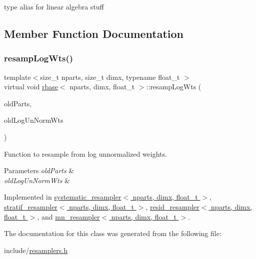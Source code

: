 type alias for linear algebra stuff 

\subsection{Member Function Documentation}
\mbox{\label{classrbase_aff0f6f88fd4656e67f5ebc870f10dd44}} 
\subsubsection{\texorpdfstring{resamp\+Log\+Wts()}{resampLogWts()}}
{\footnotesize\ttfamily template$<$size\+\_\+t nparts, size\+\_\+t dimx, typename float\+\_\+t $>$ \\
virtual void \hyperlink{classrbase}{rbase}$<$ nparts, dimx, float\+\_\+t $>$\+::resamp\+Log\+Wts (\begin{DoxyParamCaption}\item[{\hyperlink{classrbase_aa12fc826befa6ba0647b5f59ebc396ee}{array\+Vec} \&}]{old\+Parts,  }\item[{\hyperlink{classrbase_a6f76bef853e508cb5b6f546d231b06f5}{array\+Float} \&}]{old\+Log\+Un\+Norm\+Wts }\end{DoxyParamCaption})\hspace{0.3cm}{\ttfamily [pure virtual]}}



Function to resample from log unnormalized weights. 


\begin{DoxyParams}{Parameters}
{\em old\+Parts} & \\
\hline
{\em old\+Log\+Un\+Norm\+Wts} & \\
\hline
\end{DoxyParams}


Implemented in \hyperlink{classsystematic__resampler_a9467aec6002043f35f40e9e4857021ed}{systematic\+\_\+resampler$<$ nparts, dimx, float\+\_\+t $>$}, \hyperlink{classstratif__resampler_a2588147563bf3fe598e262cae7e125e6}{stratif\+\_\+resampler$<$ nparts, dimx, float\+\_\+t $>$}, \hyperlink{classresid__resampler_ae6957cd1e080ac4313e6b0bc5ae9aa96}{resid\+\_\+resampler$<$ nparts, dimx, float\+\_\+t $>$}, and \hyperlink{classmn__resampler_a13b1897e180a791a3a099d5d6329a125}{mn\+\_\+resampler$<$ nparts, dimx, float\+\_\+t $>$}.



The documentation for this class was generated from the following file\+:\begin{DoxyCompactItemize}
\item 
include/\hyperlink{resamplers_8h}{resamplers.\+h}\end{DoxyCompactItemize}
